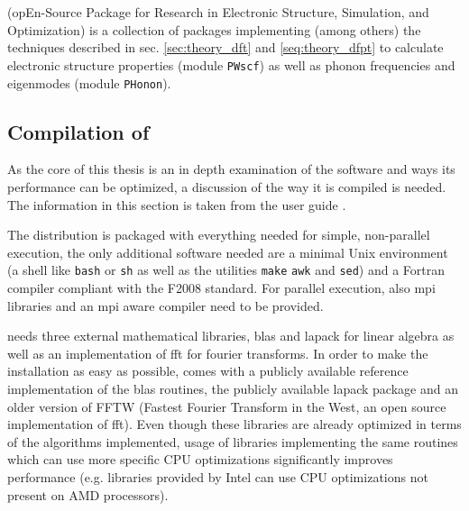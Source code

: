 \documentclass[main.tex]{subfiles}
\begin{document}
\section{\QE}\label{sec:qe}

\QE (opEn-Source Package for Research in Electronic Structure, Simulation, and Optimization) \cite{giannozzi_quantum_2009,giannozzi_advanced_2017} is a collection of packages implementing (among others) the techniques described in sec. \ref{sec:theory_dft} and \ref{seq:theory_dfpt} to calculate electronic structure properties (module \texttt{PWscf}) as well as phonon frequencies and eigenmodes (module \texttt{PHonon}).

\subsection{Compilation of \QE}\label{sub:qe_compilation}

As the core of this thesis is an in depth examination of the \QE software and ways its performance can be optimized, a discussion of the way it is compiled is needed.
The information in this section is taken from the  user guide \cite{noauthor_quantum_nodate}.

The \QE distribution is packaged with everything needed for simple, non-parallel execution, the only additional software needed are a minimal Unix environment (a shell like \texttt{bash} or \texttt{sh} as well as the utilities \texttt{make} \texttt{awk} and \texttt{sed}) and a Fortran compiler compliant with the F2008 standard.
For parallel execution, also \gls{mpi} libraries and an \gls{mpi} aware compiler need to be provided.

\QE needs three external mathematical libraries, \gls{blas} and \gls{lapack} for linear algebra as well as an implementation of \gls{fft} for fourier transforms.
In order to make the installation as easy as possible, \QE comes with a publicly available reference implementation of the \gls{blas} routines, the publicly available \gls{lapack} package and an older version of FFTW (Fastest Fourier Transform in the West, an open source implementation of \gls{fft}).
Even though these libraries are already optimized in terms of the algorithms implemented, usage of libraries implementing the same routines which can use more specific CPU optimizations significantly improves performance (e.g. libraries provided by Intel can use CPU optimizations not present on AMD processors).
\end{document}
